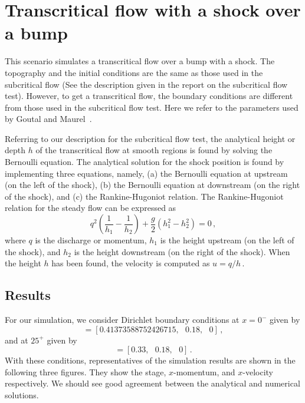 
\section{Transcritical flow with a shock over a bump}

This scenario simulates a transcritical flow over a bump with a shock. The topography and the initial conditions are the same as those used in the subcritical flow (See the description given in the report on the subcritical flow test). However, to get a transcritical flow, the boundary conditions are different from those used in the subcritical flow test. Here we refer to the parameters used by Goutal and Maurel~\cite{GM1997}.

Referring to our description for the subcritical flow test, the analytical height or depth $h$ of the transcritical flow at smooth regions is found by solving the Bernoulli equation. The analytical solution for the shock position is found by implementing three equations, namely, (a) the Bernoulli equation at upstream (on the left of the shock), (b) the Bernoulli equation at downstream (on the right of the shock), and (c) the Rankine-Hugoniot relation. The Rankine-Hugoniot relation for the steady flow can be expressed as
\begin{equation}
q^2 \left( \frac{1}{h_1} - \frac{1}{h_2} \right) + \frac{g}{2} \left(h_1^2 - h_2^2\right) = 0\,,
\end{equation}
where $q$ is the discharge or momentum, $h_1$ is the height upstream (on the left of the shock), and $h_2$ is the height downstream (on the right of the shock). When the height $h$ has been found, the velocity is computed as $u=q/h$\,.

\subsection{Results}
For our simulation, we consider Dirichlet boundary conditions
at $x=0^{-}$ given by
\begin{equation}
[w,hu,hv]=[0.41373588752426715,~~~0.18,~~~0]\,,
\end{equation}
and at $25^{+}$ given by
\begin{equation}
[w,hu,hv]=[0.33,~~~0.18,~~~0]\,.
\end{equation}
With these conditions, representatives of the simulation results are shown in the following three figures. They show the stage, $x$-momentum, and $x$-velocity respectively. We should see good agreement between the analytical and numerical solutions.

